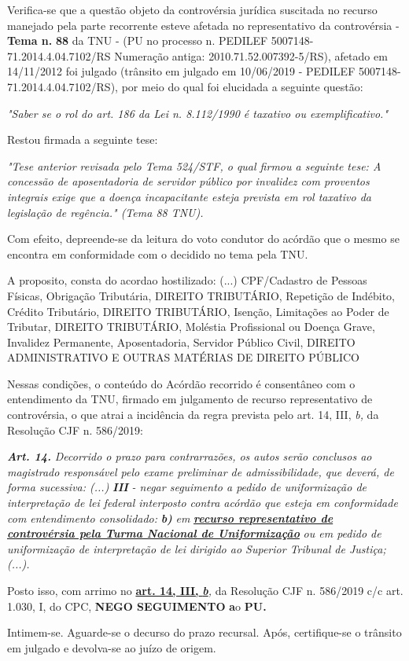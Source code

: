 \documentclass[12pt]{article}
\begin{document}
\justifying
\noindent Verifica-se que a questão objeto da controvérsia jurídica suscitada no recurso manejado pela parte recorrente esteve afetada no representativo da controvérsia - \textbf{Tema n. }\textbf{88} da TNU - (PU no processo n. PEDILEF 5007148-71.2014.4.04.7102/RS Numeração antiga: 2010.71.52.007392-5/RS),  afetado em 14/11/2012 foi julgado (trânsito em julgado em 10/06/2019 - PEDILEF 5007148-71.2014.4.04.7102/RS), por meio do qual foi elucidada a seguinte questão:

\noindent \textit{"Saber se o rol do art. 186 da Lei n. 8.112/1990 é taxativo ou exemplificativo."}

\noindent Restou firmada a seguinte tese:

\noindent \textit{"Tese anterior revisada pelo Tema 524/STF, o qual firmou a seguinte tese: A concessão de aposentadoria de servidor público por invalidez com proventos integrais exige que a doença incapacitante esteja prevista em rol taxativo da legislação de regência." (Tema 88 TNU).}

\noindent Com efeito, depreende-se da leitura do voto condutor do acórdão que o mesmo se encontra em conformidade com o decidido no  tema pela TNU.

\noindent A proposito, consta do acordao hostilizado: (...) CPF/Cadastro de Pessoas Físicas, Obrigação Tributária, DIREITO TRIBUTÁRIO, Repetição de Indébito, Crédito Tributário, DIREITO TRIBUTÁRIO, Isenção, Limitações ao Poder de Tributar, DIREITO TRIBUTÁRIO, Moléstia Profissional ou Doença Grave, Invalidez Permanente, Aposentadoria, Servidor Público Civil, DIREITO ADMINISTRATIVO E OUTRAS MATÉRIAS DE DIREITO PÚBLICO

\noindent Nessas condições, o conteúdo do Acórdão recorrido é consentâneo com o entendimento da TNU, firmado em julgamento de recurso representativo de controvérsia, o que atrai a incidência da regra prevista pelo art. 14, III, \textit{b,} da Resolução CJF n. 586/2019:

\noindent \textit{\textbf{Art. 14.}}\textit{ Decorrido o prazo para contrarrazões, os autos serão conclusos ao magistrado responsável pelo exame preliminar de admissibilidade, que deverá, de forma sucessiva: (...) }\textit{\textbf{III }}\textit{- negar seguimento a pedido de uniformização de interpretação de lei federal interposto contra acórdão que esteja em conformidade com entendimento consolidado: }\textit{\textbf{b)}}\textit{ em }\uline{\textit{\textbf{recurso representativo de controvérsia pela Turma Nacional de Uniformização}}}\textit{ ou em pedido de uniformização de interpretação de lei dirigido ao Superior Tribunal de Justiça;(...).}

\noindent Posto isso, com arrimo no \uline{\textbf{art. 14, III, }}\uline{\textit{\textbf{b}}}\textit{,} da Resolução CJF n. 586/2019 c/c art. 1.030, I, do CPC, \textbf{NEGO SEGUIMENTO }\textbf{a}o\textbf{ PU}\textbf{.}

\noindent Intimem-se. Aguarde-se o decurso do prazo recursal. Após, certifique-se o trânsito em julgado e devolva-se ao juízo de origem.
\end{document}

